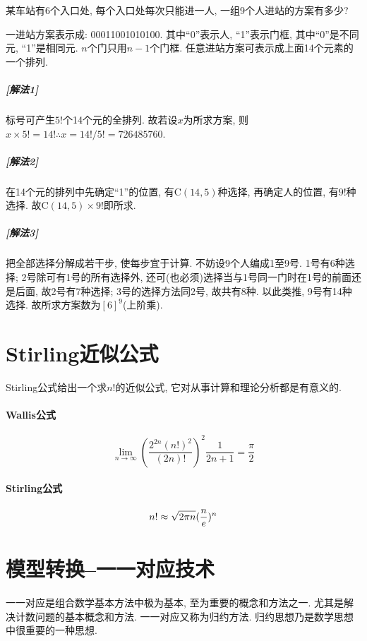         \begin{example}
            某车站有6个入口处, 每个入口处每次只能进一人, 一组9个人进站的方案有多少? 

            \begin{sol}
                一进站方案表示成: 00011001010100. 其中``0''表示人, ``1''表示门框, 其中``0''是不同元, ``1''是相同元. $n$个门只用$n-1$个门框. 任意进站方案可表示成上面14个元素的一个排列. 
                \subparagraph{\rm\textbf{[解法1]}} 标号可产生$5!$个14个元的全排列. 故若设$x$为所求方案, 则$x\times5!=14!\therefore x=14!/5!=726485760$.
                \subparagraph{\rm\textbf{[解法2]}} 在14个元的排列中先确定``1''的位置, 有C$(14,5)$种选择, 再确定人的位置, 有$9!$种选择. 故C$(14,5)\times9!$即所求. 
                \subparagraph{\rm\textbf{[解法3]}} 把全部选择分解成若干步, 使每步宜于计算. 不妨设9个人编成1至9号. 1号有6种选择; 2号除可有1号的所有选择外, 还可(也必须)选择当与1号同一门时在1号的前面还是后面, 故2号有7种选择; 3号的选择方法同2号, 故共有8种. 以此类推, 9号有14种选择. 故所求方案数为$[6]^9$(上阶乘). 
            \end{sol}
        \end{example}

\section{Stirling近似公式}

    Stirling公式给出一个求$n!$的近似公式, 它对从事计算和理论分析都是有意义的. 

    \paragraph{Wallis公式}

        \[\lim_{n\to\infty}(\frac{2^{2n}(n!)^2}{(2n)!})^2\frac{1}{2n+1}=\frac{\pi}{2}\]

    \paragraph{Stirling公式}

        \[n!\approx\sqrt{2\pi n}({n\over e})^n\]

\section{模型转换--一一对应技术}

    \textsf{一一对应}是组合数学基本方法中极为基本, 至为重要的概念和方法之一. 尤其是解决计数问题的基本概念和方法. 一一对应又称为\textsf{归约方法}. 归约思想乃是数学思想中很重要的一种思想. 

